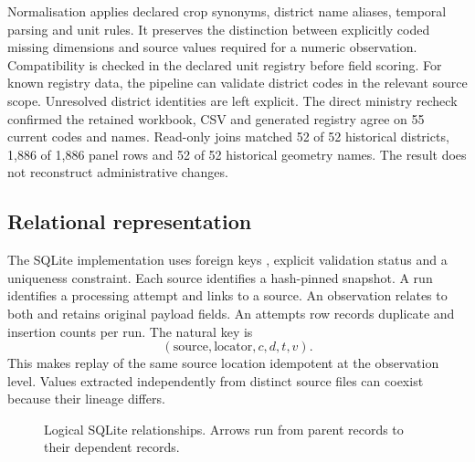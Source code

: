 \documentclass[11pt,a4paper]{article}
\begin{document}
Normalisation applies declared crop synonyms, district name aliases, temporal parsing and unit rules. It preserves the distinction between explicitly coded missing dimensions and source values required for a numeric observation. Compatibility is checked in the declared unit registry before field scoring. For known registry data, the pipeline can validate district codes in the relevant source scope. Unresolved district identities are left explicit. The direct ministry recheck confirmed the retained workbook, CSV and generated registry agree on 55 current codes and names. Read-only joins matched 52 of 52 historical districts, 1,886 of 1,886 panel rows and 52 of 52 historical geometry names. The result does not reconstruct administrative changes.

\subsection{Relational representation}
The SQLite implementation uses foreign keys \cite{sqlite}, explicit validation status and a uniqueness constraint. Each source identifies a hash-pinned snapshot. A run identifies a processing attempt and links to a source. An observation relates to both and retains original payload fields. An attempts row records duplicate and insertion counts per run. The natural key is
\[
(\mathrm{source},\mathrm{locator},c,d,t,v).
\]
This makes replay of the same source location idempotent at the observation level. Values extracted independently from distinct source files can coexist because their lineage differs.

\begin{figure}[!ht]
\centering
{}
\caption{Logical SQLite relationships. Arrows run from parent records to their dependent records.}
\label{fig:schema}
\end{figure}
\end{document}
